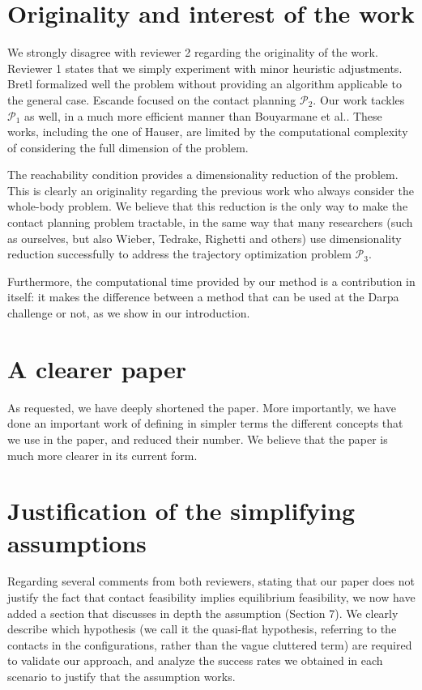 \documentclass[a4paper]{article}
\begin{document}
\section{Originality and interest of the work}
We strongly disagree with reviewer 2 regarding the originality of the work. Reviewer 1 states that we simply experiment with minor heuristic adjustments.
Bretl formalized well the problem without providing an algorithm applicable to the general case. Escande focused on the contact planning $\mathcal{P}_2$. 
Our work tackles $\mathcal{P}_1$ as well, in a much more efficient manner than Bouyarmane et al.. 
These works, including the one of Hauser, are limited by the computational complexity of considering the full dimension of the problem.


The reachability condition provides a dimensionality reduction of the problem. This is clearly an originality regarding the previous work who always consider the whole-body problem.
We believe that this reduction is the only way to make the contact planning problem tractable, in the same way that many researchers (such as ourselves, but also Wieber, Tedrake, Righetti and others) use dimensionality reduction successfully to address
the trajectory optimization problem $\mathcal{P}_3$.

Furthermore, the computational time provided by our method is a contribution in itself: it makes the difference
between a method that can be used at the Darpa challenge or not, as we show in our introduction.

\section{A clearer paper}
As requested, we have deeply shortened the paper. More importantly, we have done an important work of defining in simpler terms
the different concepts that we use in the paper, and reduced their number.
We believe that the paper is much more clearer in its current form.

\section{Justification of the simplifying assumptions}
Regarding several comments from both reviewers, stating that our paper does not justify the fact that contact feasibility implies equilibrium feasibility,
we now have added a section that discusses in depth the assumption (Section 7). We clearly describe which hypothesis (we call it the quasi-flat hypothesis, referring
to the contacts in the configurations, rather than the vague cluttered term) are required to validate our approach, and analyze
the success rates we obtained in each scenario to justify that the assumption works.
\end{document}
